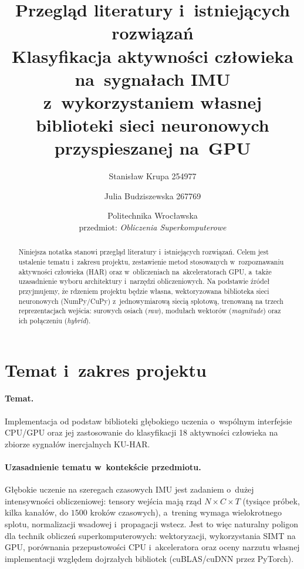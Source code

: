 \documentclass[12pt,a4paper]{article}
\title{\textbf{Przegląd literatury i~istniejących rozwiązań}\\[0.4em]
\large Klasyfikacja aktywności człowieka na~sygnałach IMU\\
z~wykorzystaniem własnej biblioteki sieci neuronowych przyspieszanej na~GPU}
\author{Stanisław Krupa 254977 \and Julia Budziszewska 267769}
\date{Politechnika Wrocławska \\ przedmiot: \textit{Obliczenia Superkomputerowe}}
\begin{document}
\maketitle

\begin{abstract}
\noindent
Niniejsza notatka stanowi przegląd literatury i~istniejących rozwiązań. Celem jest ustalenie tematu i~zakresu projektu, zestawienie metod stosowanych w~rozpoznawaniu aktywności człowieka (HAR) oraz w~obliczeniach na~akceleratorach GPU, a~także uzasadnienie wyboru architektury i~narzędzi obliczeniowych. Na podstawie źródeł przyjmujemy, że rdzeniem projektu będzie własna, wektoryzowana biblioteka sieci neuronowych (NumPy/CuPy) z~jednowymiarową siecią splotową, trenowaną na trzech reprezentacjach wejścia: surowych osiach (\textit{raw}), modułach wektorów (\textit{magnitude}) oraz ich połączeniu (\textit{hybrid}).
\end{abstract}

\section{Temat i~zakres projektu}

\paragraph{Temat.}
Implementacja od podstaw biblioteki głębokiego uczenia o~wspólnym interfejsie CPU/GPU oraz jej zastosowanie do klasyfikacji 18 aktywności człowieka na zbiorze sygnałów inercjalnych KU-HAR.

\paragraph{Uzasadnienie tematu w~kontekście przedmiotu.}
Głębokie uczenie na szeregach czasowych IMU jest zadaniem o~dużej intensywności obliczeniowej: tensory wejścia mają rząd $N \times C \times T$ (tysiące próbek, kilka kanałów, do $1500$ kroków czasowych), a~trening wymaga wielokrotnego splotu, normalizacji wsadowej i~propagacji wstecz. Jest to więc naturalny poligon dla technik obliczeń superkomputerowych: wektoryzacji, wykorzystania SIMT na GPU, porównania przepustowości CPU i~akceleratora oraz oceny narzutu własnej implementacji względem dojrzałych bibliotek (cuBLAS/cuDNN przez PyTorch).
\end{document}
